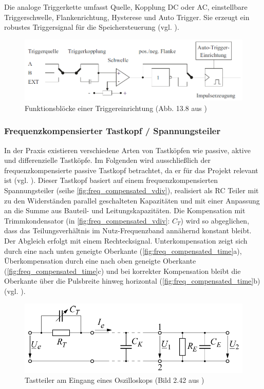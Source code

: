 \documentclass[a4paper, portrait, 12pt]{scrartcl} %
\begin{document}
Die analoge Triggerkette umfasst Quelle, Kopplung DC oder AC, einstellbare Triggerschwelle, Flankenrichtung, Hysterese und Auto Trigger. Sie erzeugt ein robustes Triggersignal für die Speichersteuerung (vgl. \cite[S. 210-212]{Muehl2020}).

\begin{figure}[H]
	\centering
		\includegraphics[scale=0.5]{trigger_circuit_oscilloscope_muehl.png} 
		\caption{\centering Funktionsblöcke einer Triggereinrichtung (Abb. 13.8 aus \cite[S. 212]{Muehl2020})}
	\label{fig:trigger_circuit_oscilloscope}
\end{figure}

\subsubsection{Frequenzkompensierter Tastkopf / Spannungsteiler}

In der Praxis existieren verschiedene Arten von Tastköpfen wie passive, aktive und differenzielle Tastköpfe. Im Folgenden wird ausschließlich der frequenzkompensierte passive Tastkopf betrachtet, da er für das Projekt relevant ist (vgl. \cite[Kap. 15]{Muehl2020}). Dieser Tastkopf basiert auf einem frequenzkompensierten Spannungsteiler (seihe \autoref{fig:freq_compensated_vdiv}), realisiert als RC Teiler mit zu den Widerständen parallel geschalteten Kapazitäten und mit einer Anpassung an die Summe aus Bauteil- und Leitungskapazitäten. Die Kompensation mit Trimmkondensator (in \autoref{fig:freq_compensated_vdiv}: $C_T$) wird so abgeglichen, dass das Teilungsverhältnis im Nutz-Frequenzband annähernd konstant bleibt. Der Abgleich erfolgt mit einem Rechtecksignal. Unterkompensation zeigt sich durch eine nach unten geneigte Oberkante (\autoref{fig:freq_compensated_time}a), Überkompensation durch eine nach oben geneigte Oberkante (\autoref{fig:freq_compensated_time}c) und bei korrekter Kompensation bleibt die Oberkante über die Pulsbreite hinweg horizontal (\autoref{fig:freq_compensated_time}b) (vgl. \cite[S. 104-106]{Schruefer2022}).

\begin{figure}[H]
	\centering
		\includegraphics[scale=0.5]{freq_compensated_vdiv_schruefer.png} 
		\caption{\centering Tastteiler am Eingang eines Oszilloskops (Bild 2.42 aus \cite[S. 105]{Schruefer2022})}
	\label{fig:freq_compensated_vdiv}
\end{figure}
\end{document}
